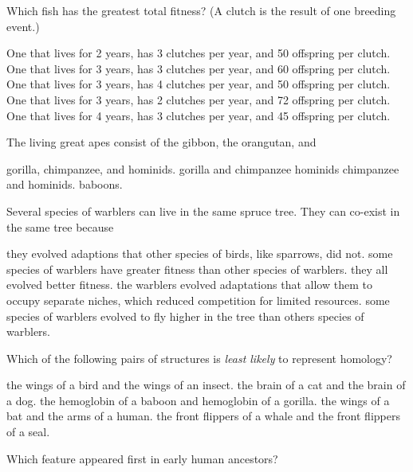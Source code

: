 \question
Which fish has the greatest total fitness? (A clutch is the result of one breeding event.)

\begin{choices}
\choice One that lives for 2 years, has 3 clutches per year, and 50 offspring per clutch.
\choice One that lives for 3 years, has 3 clutches per year, and 60 offspring per clutch.
\correctchoice One that lives for 3 years, has 4 clutches per year, and 50 offspring per clutch.
\choice One that lives for 3 years, has 2 clutches per year, and 72 offspring per clutch.
\choice One that lives for 4 years, has 3 clutches per year, and 45 offspring per clutch.
\end{choices}

\question
The living great apes consist of the gibbon, the orangutan, and

\begin{choices}
\correctchoice gorilla, chimpanzee, and hominids.
\choice gorilla and chimpanzee
\choice hominids
\choice chimpanzee and hominids.
\choice baboons.
\end{choices}

\newpage

\question
Several species of warblers can live in the same spruce tree. They can co-exist in the same tree because

\begin{choices}
\choice they evolved adaptions that other species of birds, like sparrows, did not.
\choice some species of warblers have greater fitness than other species of warblers.
\choice they all evolved better fitness.
\correctchoice the warblers evolved adaptations that allow them to occupy separate niches, which reduced competition for limited resources.
\choice some species of warblers evolved to fly higher in the tree than others species of warblers.
\end{choices}

\question
Which of the following pairs of structures is \textit{least likely} to represent homology?

\begin{choices}
\correctchoice the wings of a bird and the wings of an insect.
\choice the brain of a cat and the brain of a dog.
\choice the hemoglobin of a baboon and hemoglobin of a gorilla.
\choice the wings of a bat and the arms of a human.
\choice the front flippers of a whale and the front flippers of a seal.
\end{choices}

\question
Which feature appeared first in early human ancestors?

